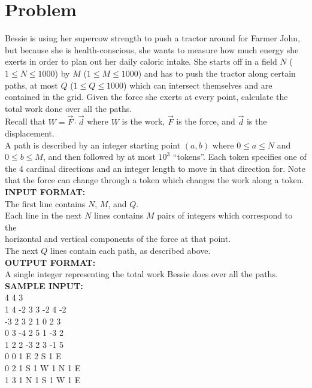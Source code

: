 \documentclass[11pt, oneside]{article}
\begin{document}
\section{Problem}

Bessie is using her supercow strength to push a tractor around for Farmer John,
but because she is health-conscious, she wants to measure how much energy
she exerts in order to plan out her daily caloric intake.
She starts off in a field \( N \) (\(1 \leq N \leq 1000\)) by \( M \) (\( 1 \leq M \leq 1000\))
and has to push the tractor along certain paths,
at most \( Q \) (\( 1 \leq Q \leq 1000\))
which can intersect themselves and are contained in the grid.
Given the force she exerts at every point,
calculate the total work done over all the paths. \\
Recall that \( W = \vec{F} \cdot \vec{d} \)
where \( W \) is the work, \( \vec{F} \) is the force, and \( \vec{d} \) is the displacement. \\

\noindent
A path is described by an integer starting point \( (a, b) \) where \( 0 \leq a \leq N \) and \(0 \leq b \leq M \),
and then followed by at most \( 10^3 \) ``tokens''.
Each token specifies one of the 4 cardinal directions
and an integer length to move in that direction for.
Note that the force can change through a token which changes the work along a token. \\

\noindent
\textbf{INPUT FORMAT:} \\
The first line contains \( N \), \( M \), and \( Q \). \\
Each line in the next \( N \) lines contains \( M \) pairs of integers
which correspond to the \\ horizontal and vertical components of the force at that point. \\
The next \( Q \) lines contain each path, as described above. \\

\noindent
\textbf{OUTPUT FORMAT:} \\
A single integer representing the total work Bessie does over all the paths. \\

\noindent
\textbf{SAMPLE INPUT:} \\
4 4 3 \\
1 4 -2 3 3 -2 4 -2 \\
-3 2 3 2 1 0 2 3 \\
0 3 -4 2 5 1 -3 2 \\
1 2 2 -3 2 3 -1 5 \\
0 0 1 E 2 S 1 E \\
0 2 1 S 1 W 1 N 1 E \\
1 3 1 N 1 S 1 W 1 E  \\
\end{document}
